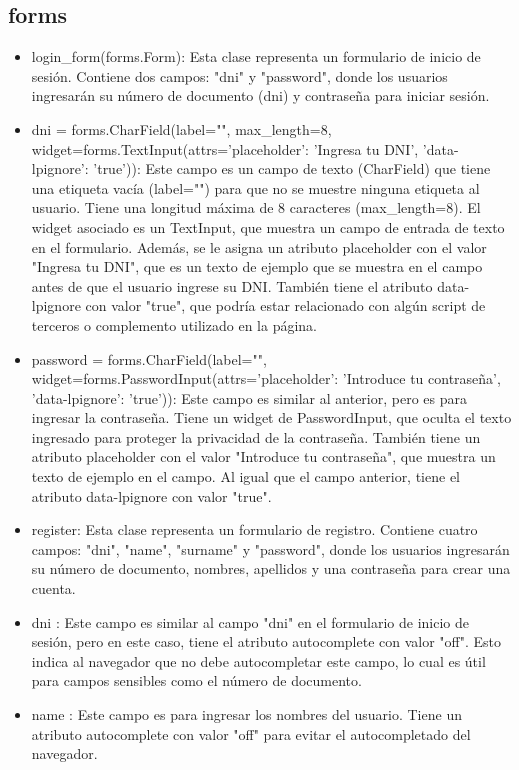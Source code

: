 \documentclass{article}
\begin{document}
	\subsection{forms}
	\begin{itemize}	
		
			\item login\_form(forms.Form): Esta clase representa un formulario de inicio de sesión. Contiene dos campos: "dni" y "password", donde los usuarios ingresarán su número de documento (dni) y contraseña para iniciar sesión.
			\item dni = forms.CharField(label="", max\_length=8, widget=forms.TextInput(attrs={'placeholder': 'Ingresa tu DNI', 'data-lpignore': 'true'})): Este campo es un campo de texto (CharField) que tiene una etiqueta vacía (label="") para que no se muestre ninguna etiqueta al usuario. Tiene una longitud máxima de 8 caracteres (max\_length=8). El widget asociado es un TextInput, que muestra un campo de entrada de texto en el formulario. Además, se le asigna un atributo placeholder con el valor "Ingresa tu DNI", que es un texto de ejemplo que se muestra en el campo antes de que el usuario ingrese su DNI. También tiene el atributo data-lpignore con valor "true", que podría estar relacionado con algún script de terceros o complemento utilizado en la página.
			\item password = forms.CharField(label="", widget=forms.PasswordInput(attrs={'placeholder': 'Introduce tu contraseña', 'data-lpignore': 'true'})): Este campo es similar al anterior, pero es para ingresar la contraseña. Tiene un widget de PasswordInput, que oculta el texto ingresado para proteger la privacidad de la contraseña. También tiene un atributo placeholder con el valor "Introduce tu contraseña", que muestra un texto de ejemplo en el campo. Al igual que el campo anterior, tiene el atributo data-lpignore con valor "true".
			\item register: Esta clase representa un formulario de registro. Contiene cuatro campos: "dni", "name", "surname" y "password", donde los usuarios ingresarán su número de documento, nombres, apellidos y una contraseña para crear una cuenta.
			\item dni : Este campo es similar al campo "dni" en el formulario de inicio de sesión, pero en este caso, tiene el atributo autocomplete con valor "off". Esto indica al navegador que no debe autocompletar este campo, lo cual es útil para campos sensibles como el número de documento.
			\item name : Este campo es para ingresar los nombres del usuario. Tiene un atributo autocomplete con valor "off" para evitar el autocompletado del navegador.

\end{itemize}
\end{document}
